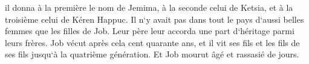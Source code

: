 \verse il donna à la première le nom de Jemima, à la seconde celui de Ketsia, et à la troisième celui de Kéren Happuc. 
\verse Il n`y avait pas dans tout le pays d`aussi belles femmes que les filles de Job. Leur père leur accorda une part d`héritage parmi leurs frères. 
\verse Job vécut après cela cent quarante ans, et il vit ses fils et les fils de ses fils jusqu`à la quatrième génération. 
\verse Et Job mourut âgé et rassasié de jours. 
